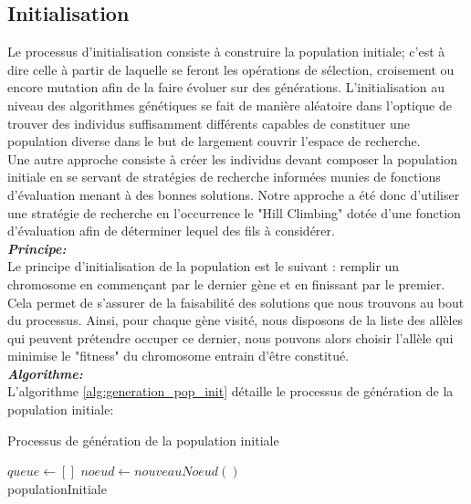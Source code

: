 	\subsection{Initialisation}
	Le processus d'initialisation consiste à construire la population initiale; c'est à dire celle à partir de laquelle se feront les opérations de sélection, croisement ou encore mutation afin de la faire évoluer sur des générations. L'initialisation au niveau des algorithmes génétiques se fait de manière aléatoire dans l'optique de trouver des individus suffisamment différents capables de constituer une population diverse dans le but de largement couvrir l'espace de recherche. \\
	\hspace*{.5cm} Une autre approche consiste à créer les individus devant composer la population initiale en se servant de stratégies de recherche informées munies de fonctions d'évaluation menant à des bonnes solutions. Notre approche a été donc d'utiliser une stratégie de recherche en l’occurrence le "Hill Climbing" dotée d'une fonction d'évaluation afin de déterminer lequel des fils à considérer.\\
	\hspace*{.5cm} \textbf{\textsl{Principe:}}\\
	Le principe d'initialisation de la population est le suivant : remplir un chromosome en commençant par le dernier gène et en finissant par le premier. Cela permet de s'assurer de la faisabilité des solutions que nous trouvons au bout du processus. Ainsi, pour chaque gène visité, nous disposons de la liste des allèles qui peuvent prétendre occuper ce dernier, nous pouvons alors choisir l'allèle qui minimise le "fitness" du chromosome entrain d'être constitué.\\
	\hspace*{.5cm} \textbf{\textsl{Algorithme:}}\\	
	L'algorithme \ref{alg:generation_pop_init} détaille le processus de génération de la population initiale: \\
	
	\begin{algorithm}[H]
		\caption{Processus de génération de la population initiale}
		\label{alg:generation_pop_init}
 		\BlankLine
		\BlankLine 		
		$queue \gets []$
		\BlankLine
		$noeud \gets nouveauNoeud()$ \\
		\BlankLine
	\Return populationInitiale
	\end{algorithm}	
	
